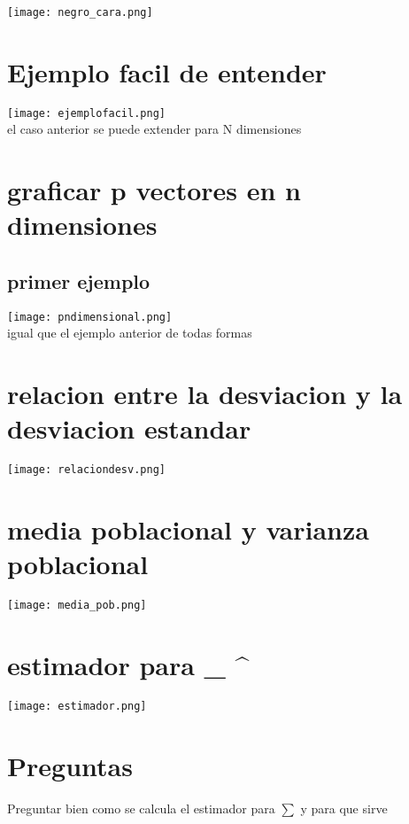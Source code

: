 \documentclass[10pt,a4paper]{article} %
\begin{document}
    \title{\rmfamily\normalfont{}}
    \author{}
    \date{\today} 
    
    \maketitle
     

    \texttt{[image: negro\_cara.png]}
    \section{Ejemplo facil de entender}
        \texttt{[image: ejemplofacil.png]} 
        \\ el caso anterior se puede extender para N dimensiones 
    \section{graficar p vectores en n dimensiones}
        \subsection{primer ejemplo}
            \texttt{[image: pndimensional.png]}
            \\ igual que el ejemplo anterior de todas formas
    \section{relacion entre la desviacion y la desviacion estandar}
        \texttt{[image: relaciondesv.png]}
        \\ 

    \section{media poblacional y varianza poblacional}
        \texttt{[image: media\_pob.png]}
        \\     
    \section{estimador para \sum_{  }^{ } }
        \texttt{[image: estimador.png]}
    \section{Preguntas}
        Preguntar bien como se calcula el estimador para $ \sum  $  y para que sirve







    
    \nocite{*}
    
    
\end{document}
